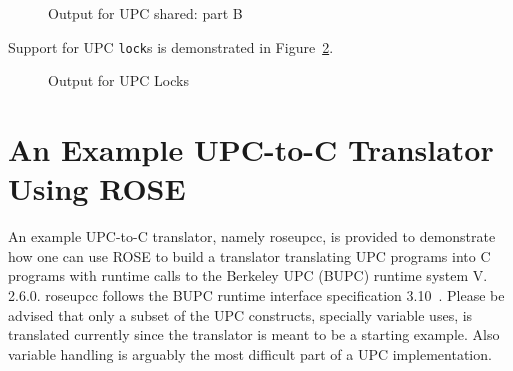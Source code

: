 \begin{figure}[!h]
{\indent
  {\mySmallFontSize
    \begin{latexonly}
    
    \end{latexonly}
    \begin{htmlonly}
    
    \end{htmlonly}
  }
}
\caption{Output for UPC shared: part B}
\label{Manual:UPC:sharedab}
\end{figure}

\clearpage
Support for UPC \lstinline{lock}s is demonstrated in
Figure~\ref{Manual:UPC:lock}. 
\begin{figure}[!h]
{\indent
  {\mySmallFontSize
    \begin{latexonly}
    
    \end{latexonly}
    \begin{htmlonly}
    
    \end{htmlonly}
  }
}
\caption{Output for UPC Locks}
\label{Manual:UPC:lock}
\end{figure}

\clearpage
\section{An Example UPC-to-C Translator Using ROSE}
An example UPC-to-C translator, namely roseupcc, is provided to 
demonstrate how one can use ROSE to build a translator translating UPC
programs into C programs with runtime calls to the Berkeley UPC (BUPC)
runtime system V. 2.6.0. 
roseupcc follows the BUPC runtime interface specification
3.10~\cite{BUPC3.10}.
Please be advised that only a subset of the UPC constructs, specially
variable uses, is
translated currently since the translator is meant to be a starting example.
Also variable handling is arguably the most difficult part of a UPC
implementation.

